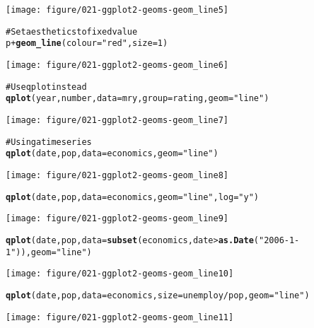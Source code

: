 \documentclass[a4paper,titlepage]{tufte-handout}\usepackage{graphicx, color}
\makeatletter
\def\maxwidth{ %
  \ifdim\Gin@nat@width>\linewidth
    \linewidth
  \else
    \Gin@nat@width
  \fi
}
\newcommand{\hlfunctioncall}[1]{\textcolor[rgb]{0.501960784313725,0,0.329411764705882}{\textbf{#1}}}%
\newcommand{\hlstring}[1]{\textcolor[rgb]{0.6,0.6,1}{#1}}%
\newcommand{\hlcomment}[1]{\textcolor[rgb]{0.180392156862745,0.6,0.341176470588235}{#1}}%
\newenvironment{kframe}{%
 \def\at@end@of@kframe{}%
 \ifinner\ifhmode%
  \def\at@end@of@kframe{\end{minipage}}%
  \begin{minipage}{\columnwidth}%
 \fi\fi%
 \def\FrameCommand##1{\hskip\@totalleftmargin \hskip-\fboxsep
 \colorbox{shadecolor}{##1}\hskip-\fboxsep
     \hskip-\linewidth \hskip-\@totalleftmargin \hskip\columnwidth}%
 \MakeFramed {\advance\hsize-\width
   \@totalleftmargin\z@ \linewidth\hsize
   \@setminipage}}%
 {\par\unskip\endMakeFramed%
 \at@end@of@kframe}
\newenvironment{knitrout}{}{} %
\makeatother
\begin{document}
\begin{knitrout}
\begin{kframe}
\end{kframe}\texttt{[image: figure/021-ggplot2-geoms-geom\_line5]} \begin{kframe}\begin{alltt}
\hlcomment{# Set aesthetics to fixed value}
p + \hlfunctioncall{geom_line}(colour = \hlstring{"red"}, size = 1)
\end{alltt}
\end{kframe}\texttt{[image: figure/021-ggplot2-geoms-geom\_line6]} \begin{kframe}\begin{alltt}
\hlcomment{# Use qplot instead}
\hlfunctioncall{qplot}(year, number, data=mry, group=rating, geom=\hlstring{"line"})
\end{alltt}
\end{kframe}\texttt{[image: figure/021-ggplot2-geoms-geom\_line7]} \begin{kframe}\begin{alltt}
\hlcomment{# Using a time series}
\hlfunctioncall{qplot}(date, pop, data=economics, geom=\hlstring{"line"})
\end{alltt}
\end{kframe}\texttt{[image: figure/021-ggplot2-geoms-geom\_line8]} \begin{kframe}\begin{alltt}
\hlfunctioncall{qplot}(date, pop, data=economics, geom=\hlstring{"line"}, log=\hlstring{"y"})
\end{alltt}
\end{kframe}\texttt{[image: figure/021-ggplot2-geoms-geom\_line9]} \begin{kframe}\begin{alltt}
\hlfunctioncall{qplot}(date, pop, data=\hlfunctioncall{subset}(economics, date > \hlfunctioncall{as.Date}(\hlstring{"2006-1-1"})), geom=\hlstring{"line"})
\end{alltt}
\end{kframe}\texttt{[image: figure/021-ggplot2-geoms-geom\_line10]} \begin{kframe}\begin{alltt}
\hlfunctioncall{qplot}(date, pop, data=economics, size=unemploy/pop, geom=\hlstring{"line"})
\end{alltt}
\end{kframe}\texttt{[image: figure/021-ggplot2-geoms-geom\_line11]} \begin{kframe}\begin{alltt}

\end{alltt}
\end{kframe}
\end{knitrout}
\end{document}
